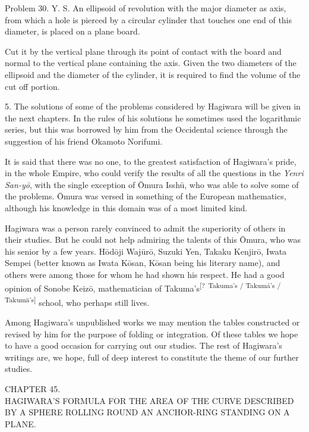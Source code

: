 \documentclass[11pt]{article}
\newcommand{\scanpage}[2]{\clearpage\setcounter{footnote}{0}\noindent{\footnotesize\color{gray}PDF page #1 · #2}\par\medskip}
\newcommand{\unclear}[1]{\textsuperscript{[?~#1]}}
\begin{document}
Problem 30. Y. S. An ellipsoid of revolution with the major diameter as axis, from which a hole is pierced by a circular cylinder that touches one end of this diameter, is placed on a plane board.

\scanpage{0325}{printed page 311}
\noindent Cut it by the vertical plane through its point of contact with the board and normal to the vertical plane containing the axis. Given the two diameters of the ellipsoid and the diameter of the cylinder, it is required to find the volume of the cut off portion.

5. The solutions of some of the problems considered by Hagiwara will be given in the next chapters. In the rules of his solutions he sometimes used the logarithmic series, but this was borrowed by him from the Occidental science through the suggestion of his friend Okamoto Norifumi.

It is said that there was no one, to the greatest satisfaction of Hagiwara's pride, in the whole Empire, who could verify the results of all the questions in the \emph{Yenri San-yō}, with the single exception of Ōmura Isshū, who was able to solve some of the problems. Ōmura was versed in something of the European mathematics, although his knowledge in this domain was of a most limited kind.

Hagiwara was a person rarely convinced to admit the superiority of others in their studies. But he could not help admiring the talents of this Ōmura, who was his senior by a few years. Hōdōji Wajūrō, Suzuki Yen, Takaku Kenjirō, Iwata Sempei (better known as Iwata Kōsan, Kōsan being his literary name), and others were among those for whom he had shown his respect. He had a good opinion of Sonobe Keizō, mathematician of Takuma's\unclear{Takuma's / Takumá's / Takumā's} school, who perhaps still lives.

Among Hagiwara's unpublished works we may mention the tables constructed or revised by him for the purpose of folding or integration. Of these tables we hope to have a good occasion for carrying out our studies. The rest of Hagiwara's writings are, we hope, full of deep interest to constitute the theme of our further studies.

\begin{center}
CHAPTER 45.\\[1mm]
HAGIWARA'S FORMULA FOR THE AREA OF THE CURVE DESCRIBED BY A SPHERE ROLLING ROUND AN ANCHOR-RING STANDING ON A PLANE.
\end{center}
\end{document}
